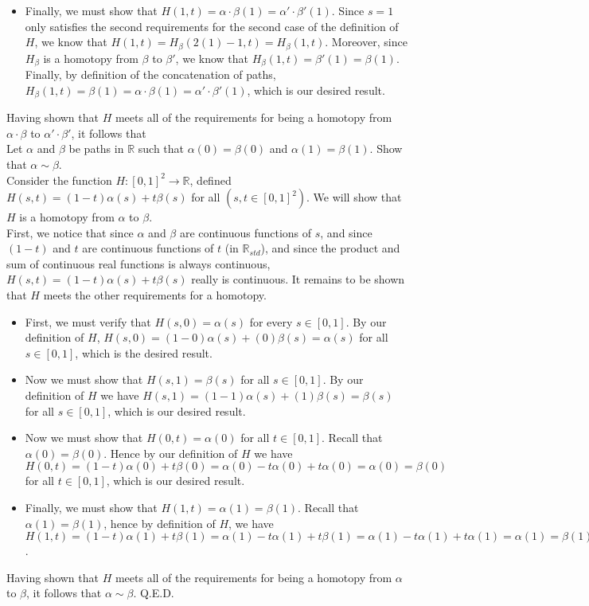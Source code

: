 \documentclass{article}
\newcommand{\R}{\mathbb{R}}
\newcommand{\R}{\mathbb{R}}
\begin{document}
\begin{itemize}
    \item Finally, we must show that $H(1,t) = \alpha\cdot\beta(1) = \alpha'\cdot\beta'(1)$. Since $s = 1$ only satisfies the second requirements for the second case of the definition of $H$, we know that $ H(1,t) = H_\beta(2(1) - 1, t) = H_\beta(1,t)$. Moreover, since $H_\beta$ is a homotopy from $\beta$ to $\beta'$, we know that $H_\beta(1,t) = \beta'(1) = \beta(1)$. Finally, by definition of the concatenation of paths, $H_\beta(1,t) = \beta(1) = \alpha\cdot\beta(1) = \alpha'\cdot\beta'(1)$, which is our desired result.
\end{itemize}
Having shown that $H$ meets all of the requirements for being a homotopy from $\alpha\cdot\beta$ to $\alpha'\cdot\beta'$, it follows that 
\\

 Let $\alpha$ and $\beta$ be paths in $\R$ such that $\alpha(0) = \beta(0)$ and $\alpha(1) = \beta(1)$. Show that $\alpha\sim \beta$.\\

 Consider the function $H:[0,1]^2 \rightarrow \R$, defined $H(s,t) = (1-t)\alpha(s) + t\beta(s)$ for all $(s,t\in [0,1]^2).$ We will show that $H$ is a homotopy from $\alpha$ to $\beta$.\\

First, we notice that since $\alpha$ and $\beta$ are continuous functions of $s$, and since $(1-t)$ and $t$ are continuous functions of $t$ (in $\R_{std}$), and since the product and sum of continuous real functions is always continuous, $H(s,t) = (1-t)\alpha(s) + t\beta(s)$ really is continuous. It remains to be shown that $H$ meets the other requirements for a homotopy.

\begin{itemize}
    \item First, we must verify that $H(s,0) = \alpha(s)$ for every $s\in [0,1]$. By our definition of $H$, $H(s,0) = (1-0)\alpha(s) + (0)\beta(s) = \alpha(s)$ for all $s\in [0,1]$, which is the desired result.
    \item Now we must show that $H(s,1) = \beta(s)$ for all $s\in [0,1]$. By our definition of $H$ we have $H(s,1) = (1-1)\alpha(s)  + (1)\beta(s) = \beta(s)$ for all $s\in [0,1]$, which is our desired result.
    \item Now we must show that $H(0,t) = \alpha(0)$ for all $t\in [0,1]$. Recall that $\alpha(0) = \beta(0)$. Hence by our definition of $H$ we have $H(0,t) = (1-t)\alpha(0) + t\beta(0) = \alpha(0)- t\alpha(0) + t\alpha(0) =\alpha(0) = \beta(0)$ for all $t\in [0,1]$, which is our desired result.
    \item Finally, we must show that $H(1,t ) = \alpha(1) = \beta(1)$. Recall that $\alpha(1) = \beta(1)$, hence by definition of $H$, we have $H(1,t) = (1-t)\alpha(1) + t\beta(1) = \alpha(1) - t\alpha(1) + t\beta(1) = \alpha(1) - t\alpha(1) + t\alpha(1) = \alpha(1) = \beta(1)$. 
\end{itemize}
Having shown that $H$ meets all of the requirements for being a homotopy from $\alpha$ to $\beta$, it follows that $\alpha\sim \beta$. Q.E.D. 
\end{document}

